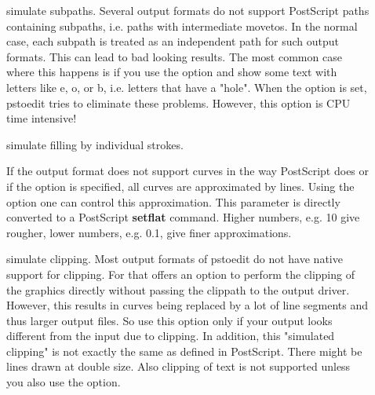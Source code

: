 \documentclass[english,a4paper]{article}
\begin{document}
\begin{description}
\item[]
simulate subpaths.
Several output formats do not support PostScript paths containing subpaths, i.e. paths with intermediate movetos. In the normal case, each subpath is treated as an independent path for such output formats. This can lead to bad looking results. The most common case where this happens is if you use the  option and show some text with letters like e, o, or b, i.e. letters that have a "hole". When the  option is set, pstoedit tries to eliminate these problems. However, this option is CPU time intensive!


\item[]
simulate filling by individual strokes.



\item[]
If the output format does not support curves in the way PostScript does or if the  option is specified, all curves are approximated by lines. Using the  option one can control this approximation. This parameter is directly converted to a PostScript \textbf{setflat} command. Higher numbers, e.g. 10 give rougher, lower numbers, e.g. 0.1, give finer approximations.


\item[]
simulate clipping.
Most output formats of pstoedit do not have native support for clipping. For that  offers an option to perform the clipping of the graphics directly without passing the clippath to the output driver. However, this results in curves being replaced by a lot of line segments and thus larger output files. So use this option only if your output looks different from the input due to clipping. In addition, this "simulated clipping" is not exactly the same as defined in PostScript. There might be lines drawn at double size. Also clipping of text is not supported unless you also use the  option.


\end{description}
\end{document}
